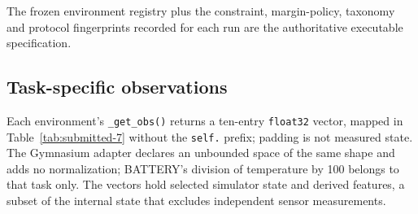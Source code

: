 \documentclass[10pt]{article}
\begin{document}
The frozen environment registry plus the constraint, margin-policy, taxonomy
and protocol fingerprints recorded for each run are the authoritative
executable specification.


\subsection{Task-specific observations}

Each environment's \texttt{\_get\_obs()} returns a ten-entry \texttt{float32}
vector, mapped in Table~\ref{tab:submitted-7} without the \texttt{self.}
prefix; padding is not measured state. The Gymnasium adapter declares an
unbounded space of the same shape and adds no normalization; BATTERY's
division of temperature by 100 belongs to that task only. The vectors hold selected simulator state and derived features, a subset of the internal state that excludes independent sensor measurements.
\end{document}
